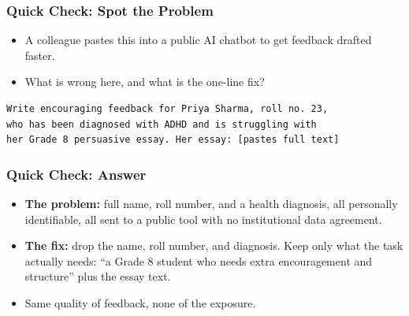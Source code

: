 \begin{frame}[fragile]\frametitle{Quick Check: Spot the Problem}
\begin{itemize}
\item A colleague pastes this into a public AI chatbot to get feedback drafted faster.
\item What is wrong here, and what is the one-line fix?
\end{itemize}
\begin{lstlisting}[language=HTML]
Write encouraging feedback for Priya Sharma, roll no. 23,
who has been diagnosed with ADHD and is struggling with
her Grade 8 persuasive essay. Her essay: [pastes full text]
\end{lstlisting}
\end{frame}

\begin{frame}[fragile]\frametitle{Quick Check: Answer}
\begin{itemize}
\item \textbf{The problem:} full name, roll number, and a health diagnosis, all personally identifiable, all sent to a public tool with no institutional data agreement.
\item \textbf{The fix:} drop the name, roll number, and diagnosis. Keep only what the task actually needs: ``a Grade 8 student who needs extra encouragement and structure'' plus the essay text.
\item Same quality of feedback, none of the exposure.
\end{itemize}
\end{frame}

